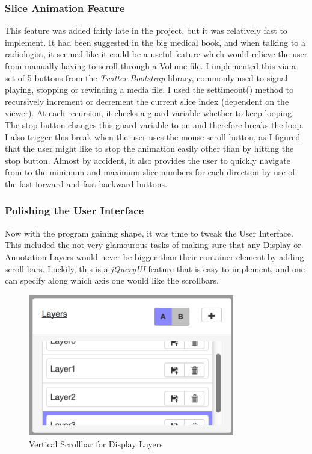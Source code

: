 \documentclass[a4paper,11pt,twoside]{article}
\begin{document}
\subsubsection{Slice Animation Feature}

This feature was added fairly late in the project, but it was relatively fast to implement. It had been suggested in the big medical book, and when talking to a radiologist, it seemed like it could be a useful feature which would relieve the user from manually having to scroll through a Volume file. I implemented this via a set of 5 buttons from the \textit{Twitter-Bootstrap} library, commonly used to signal playing, stopping or rewinding a media file. I used the settimeout() method to recursively increment or decrement the current slice index (dependent on the viewer). At each recursion, it checks a guard variable whether to keep looping. The stop button changes this guard variable to on and therefore breaks the loop. I also trigger this break when the user uses the mouse scroll button, as I figured that the user might like to stop the animation easily other than by hitting the stop button. Almost by accident, it also provides the user to quickly navigate from to the minimum and maximum slice numbers for each direction by use of the fast-forward and fast-backward buttons.


\subsubsection{Polishing the User Interface}

Now with the program gaining shape, it was time to tweak the User Interface. This included the not very glamourous tasks of making sure that any Display or Annotation Layers would never be bigger than their container element by adding scroll bars. Luckily, this is a \textit{jQueryUI} feature that is easy to implement, and one can specify along which axis one would like the scrollbars.

\begin{figure}[ht!]
\centering
\includegraphics[width=90mm]{graphics/scrollbar_01.png}
\caption{Vertical Scrollbar for Display Layers}
\label{fig:UIdesign1}
\end{figure}
\end{document}
